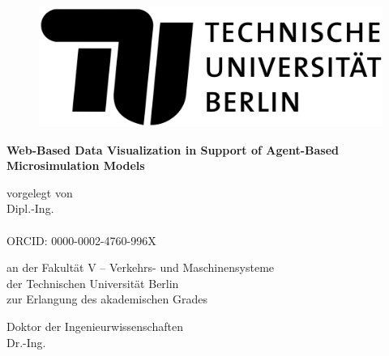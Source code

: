 
\thispagestyle{empty}

\begin{flushright}

	\begin{figure}[!h]
  	\begin{minipage}{1.62\linewidth}
	\begin{center}
	\includegraphics[scale=0.085]{chapters/title/tu-logo-2023.png}
  	\end{center}
  	\end{minipage}
	\end{figure}

	\vspace{20mm}

	\LARGE

	\textbf{\hspace{60mm}Web-Based Data Visualization in Support of Agent-Based\\
	Microsimulation Models} \\[2cm]

	\hrulefill

	\large
	vorgelegt von\\

	Dipl.-Ing. \\
	\Autor\\
	ORCID: 0000-0002-4760-996X\\
	\vspace{8mm}

	an der Fakultät V -- Verkehrs- und Maschinensysteme\\
	der Technischen Universität Berlin \\
	zur Erlangung des akademischen Grades\\

	\vspace{5mm}

	Doktor der Ingenieurwissenschaften\\
	Dr.-Ing.\\
	\vspace{5mm}


\end{flushright}
